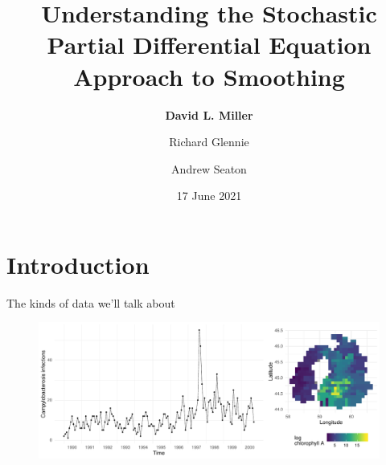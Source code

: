 \documentclass{beamer}
\title{Understanding the Stochastic Partial Differential Equation Approach to Smoothing}
\date{17 June 2021}
\author{\textbf{David L. Miller} \and Richard Glennie \and Andrew Seaton}
\institute{International Biometric Society Journal Club}
\begin{document}
\maketitle



\section{Introduction}

\begin{frame}{The kinds of data we'll talk about}
  \begin{figure}[h]
    \begin{center}
      \includegraphics[width=\textwidth]{figures/ex_data.pdf}
    \end{center}
  \end{figure}
\end{frame}
\end{document}
